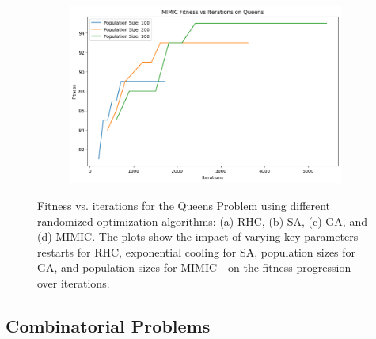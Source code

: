 \begin{figure}[htbp]
\begin{subfigure}[b]{0.49\textwidth}
        \caption{}
        \label{fig:queensga}
    \end{subfigure}
    \hfill
    \begin{subfigure}[b]{0.49\textwidth}
        \centering
        \includegraphics[width=\textwidth]{image/queens/mimic.png}
        \caption{}
        \label{fig:queensmimic}
    \end{subfigure}
    \caption{Fitness vs. iterations for the Queens Problem using different randomized optimization algorithms: (a) RHC, (b) SA, (c) GA, and (d) MIMIC. The plots show the impact of varying key parameters—restarts for RHC, exponential cooling for SA, population sizes for GA, and population sizes for MIMIC—on the fitness progression over iterations.}
    \label{fig:queensgrid}
\end{figure}

\subsection{Combinatorial Problems}

